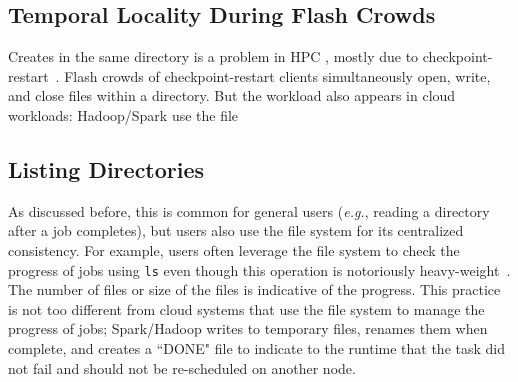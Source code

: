 
\subsection{Temporal Locality During Flash Crowds}
\label{sec:temporal-locality-during-flash-crowds}

Creates in the same directory is a problem in HPC , mostly due to
checkpoint-restart~\cite{bent_plfs_2009}. Flash crowds of checkpoint-restart
clients simultaneously open, write, and close files within a directory.  But
the workload also appears in cloud workloads: Hadoop/Spark use the file
  

\subsection{Listing Directories}
\label{sec:listing-directories}

As discussed before, this is common for general users ({\it e.g.}, reading a
directory after a job completes), but users also use the file system for its
centralized consistency.  For example, users often leverage the file system to
check the progress of jobs using \texttt{ls} even though this operation is
notoriously heavy-weight~\cite{carns:ipdps09-pvfs, eshel:fast10-panache}. The
number of files or size of the files is indicative of the progress. This
practice is not too different from cloud systems that use the file system to
manage the progress of jobs; Spark/Hadoop writes to temporary files, renames
them when complete, and creates a ``DONE" file to indicate to the runtime that
the task did not fail and should not be re-scheduled on another node.

